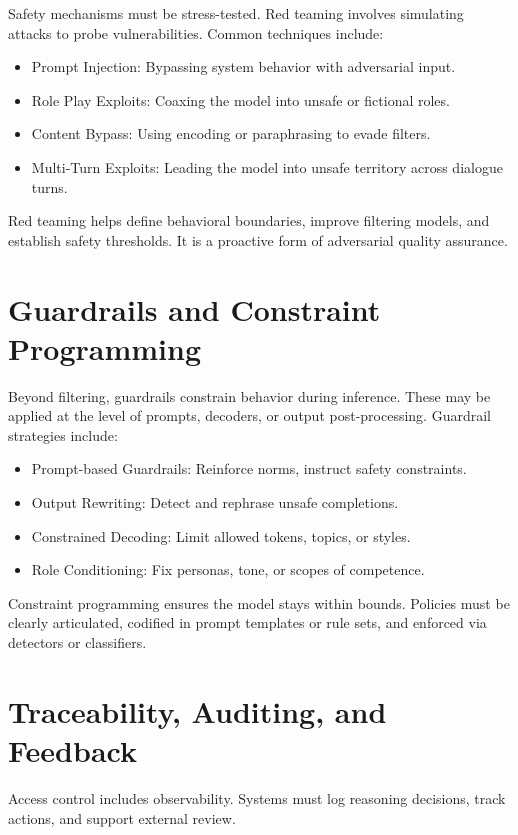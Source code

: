 \documentclass{book}
\begin{document}
Safety mechanisms must be stress-tested. Red teaming involves simulating attacks to probe vulnerabilities. Common techniques include:

\begin{itemize}
  \item Prompt Injection: Bypassing system behavior with adversarial input.
  \item Role Play Exploits: Coaxing the model into unsafe or fictional roles.
  \item Content Bypass: Using encoding or paraphrasing to evade filters.
  \item Multi-Turn Exploits: Leading the model into unsafe territory across dialogue turns.
\end{itemize}

Red teaming helps define behavioral boundaries, improve filtering models, and establish safety thresholds. It is a proactive form of adversarial quality assurance.

\section{Guardrails and Constraint Programming}

Beyond filtering, guardrails constrain behavior during inference. These may be applied at the level of prompts, decoders, or output post-processing. Guardrail strategies include:

\begin{itemize}
  \item Prompt-based Guardrails: Reinforce norms, instruct safety constraints.
  \item Output Rewriting: Detect and rephrase unsafe completions.
  \item Constrained Decoding: Limit allowed tokens, topics, or styles.
  \item Role Conditioning: Fix personas, tone, or scopes of competence.
\end{itemize}

Constraint programming ensures the model stays within bounds. Policies must be clearly articulated, codified in prompt templates or rule sets, and enforced via detectors or classifiers.

\section{Traceability, Auditing, and Feedback}

Access control includes observability. Systems must log reasoning decisions, track actions, and support external review.
\end{document}
